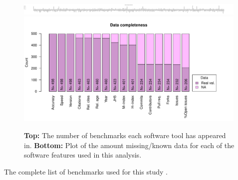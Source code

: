 \documentclass[fleqn,10pt]{SelfArx} %
\begin{document}
\clearpage
\newpage

\begin{figure}[H]
\centering
\includegraphics[width=0.99\textwidth]{numberBenchmarksPerToolBarplot.pdf}\\
\includegraphics[width=0.99\textwidth]{numberRealValueFeaturesBarplot.pdf}
\caption{ {\bf Top:} The number of benchmarks each software tool has appeared in. {\bf Bottom:}
  Plot of the amount missing/known data for each of the software features used in this analysis. 
 }
\label{fig:numBenchmarks}
\end{figure}



\clearpage
\newpage


The complete list of benchmarks used for this study
\cite{pmid32183840,
pmid32138645,
pmid31948481,
pmid31874603,
pmid31984131,
pmid31639029,
pmid31465436,
pmid31324872,
pmid31159850,
pmid31136576,
pmid31080946,
pmid31015787,
pmid30936559,
pmid30717772,
pmid30658573,
pmid29568413,
pmid28934964,
pmid28808243,
pmid28739658,
pmid28569140,
pmid28052134,
pmid27256311,
pmid26862001,
pmid26778510,
pmid26628557,
pmid26220471,
pmid25777524,
pmid25760244,
pmid25574120,
pmid25521762,
pmid25511303,
pmid25198770,
pmid24839440,
pmid24708189,
pmid24602402,
pmid24526711,
pmid24086547,
pmid23842808,
pmid23758764,
pmid23593445,
pmid23393030,
pmid22574964,
pmid22506536,
pmid22492192,
pmid22287634,
pmid22152123,
pmid22172045,
pmid22132132,
pmid21856737,
pmid21615913,
pmid21525877,
pmid21483869,
pmid21423806,
pmid21113338,
pmid20617200,
pmid20047664,
pmid19179695,
pmid19126200,
pmid19046431,
pmid18793413,
pmid18287116,
pmid17151342,
pmid17062146,
pmid15840834,
pmid15701525,
ng2013estimating}.




\end{document}
